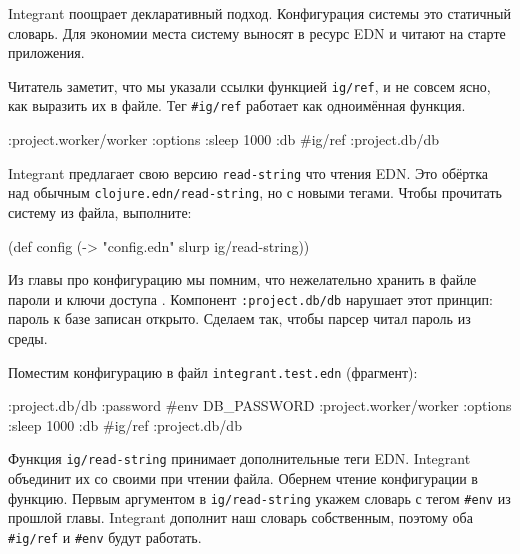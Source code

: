 
Integrant поощрает декларативный подход. Конфигурация системы это статичный
словарь. Для экономии места систему выносят в ресурс EDN и читают на старте
приложения.


Читатель заметит, что мы указали ссылки функцией \verb|ig/ref|, и не совсем
ясно, как выразить их в файле. Тег \verb|#ig/ref| работает как одноимённая
функция.

\begin{english}
  \begin{clojure}
{:project.worker/worker {:options {:sleep 1000}
                         :db #ig/ref :project.db/db}}
  \end{clojure}
\end{english}


Integrant предлагает свою версию \verb|read-string| что чтения EDN. Это
обёртка над обычным \verb|clojure.edn/read-string|, но с новыми тегами. Чтобы
прочитать систему из файла, выполните:

\begin{english}
  \begin{clojure}
(def config
  (-> "config.edn" slurp ig/read-string))
  \end{clojure}
\end{english}


Из главы про конфигурацию мы помним, что нежелательно хранить в файле пароли и
ключи доступа . Компонент \verb|:project.db/db| нарушает
этот принцип: пароль к базе записан открыто. Сделаем так, чтобы парсер читал
пароль из среды.

Поместим конфигурацию в файл \verb|integrant.test.edn| (фрагмент):

\begin{english}
  \begin{clojure}
{:project.db/db {:password #env DB_PASSWORD}
 :project.worker/worker {:options {:sleep 1000}
                         :db #ig/ref :project.db/db}}
  \end{clojure}
\end{english}

Функция \verb|ig/read-string| принимает дополнительные теги EDN. Integrant
объединит их со своими при чтении файла. Обернем чтение конфигурации в
функцию. Первым аргументом в \verb|ig/read-string| укажем словарь с тегом
\verb|#env| из прошлой главы. Integrant дополнит наш словарь собственным,
поэтому оба \verb|#ig/ref| и \verb|#env| будут работать.

